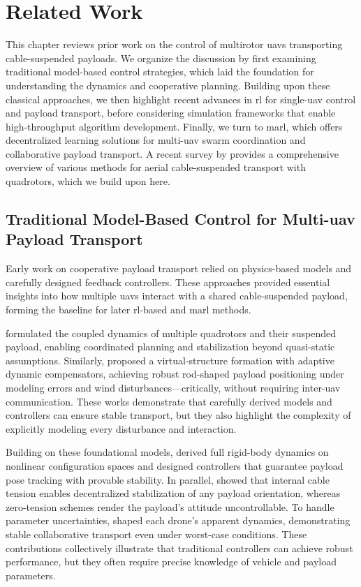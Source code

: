 \chapter{Related Work}
This chapter reviews prior work on the control of multirotor \gls{uav}s transporting cable-suspended payloads. We organize the discussion by first examining traditional model-based control strategies, which laid the foundation for understanding the dynamics and cooperative planning. Building upon these classical approaches, we then highlight recent advances in \gls{rl} for single-\gls{uav} control and payload transport, before considering simulation frameworks that enable high-throughput algorithm development. Finally, we turn to \gls{marl}, which offers decentralized learning solutions for multi-\gls{uav} swarm coordination and collaborative payload transport. A recent survey by \cite{estevez_review_2024} provides a comprehensive overview of various methods for aerial cable-suspended transport with quadrotors, which we build upon here.

\section{Traditional Model-Based Control for Multi-\gls{uav} Payload Transport}
Early work on cooperative payload transport relied on physics-based models and carefully designed feedback controllers. These approaches provided essential insights into how multiple \gls{uav}s interact with a shared cable-suspended payload, forming the baseline for later \gls{rl}-based and \gls{marl} methods.

\cite{sreenath_dynamics_2013} formulated the coupled dynamics of multiple quadrotors and their suspended payload, enabling coordinated planning and stabilization beyond quasi-static assumptions. Similarly, \cite{villa_cooperative_2021} proposed a virtual-structure formation with adaptive dynamic compensators, achieving robust rod-shaped payload positioning under modeling errors and wind disturbances—critically, without requiring inter-\gls{uav} communication. These works demonstrate that carefully derived models and controllers can ensure stable transport, but they also highlight the complexity of explicitly modeling every disturbance and interaction.

Building on these foundational models, \cite{lee_geometric_2018} derived full rigid-body dynamics on nonlinear configuration spaces and designed controllers that guarantee payload pose tracking with provable stability. In parallel, \cite{tognon_aerial_2018} showed that internal cable tension enables decentralized stabilization of any payload orientation, whereas zero-tension schemes render the payload's attitude uncontrollable. To handle parameter uncertainties, \cite{tagliabue_robust_2017} shaped each drone's apparent dynamics, demonstrating stable collaborative transport even under worst-case conditions. These contributions collectively illustrate that traditional controllers can achieve robust performance, but they often require precise knowledge of vehicle and payload parameters.

